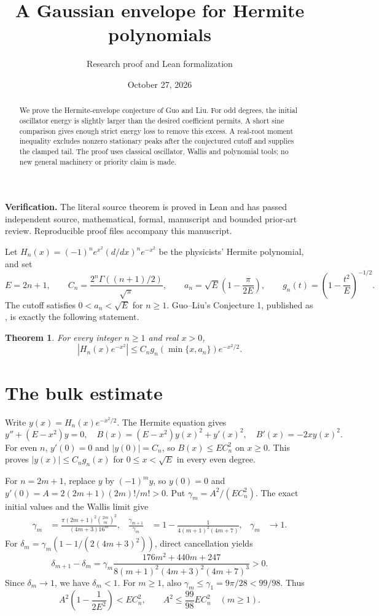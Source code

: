 \documentclass[11pt]{article}
\title{A Gaussian envelope for Hermite polynomials}
\author{Research proof and Lean formalization}
\date{October 27, 2026}
\newtheorem{theorem}{Theorem}
\begin{document}
\maketitle
\begin{abstract}
We prove the Hermite-envelope conjecture of Guo and Liu. For odd degrees, the initial oscillator energy is slightly larger than the desired coefficient permits. A short sine comparison gives enough strict energy loss to remove this excess. A real-root moment inequality excludes nonzero stationary peaks after the conjectured cutoff and supplies the clamped tail. The proof uses classical oscillator, Wallis and polynomial tools; no new general machinery or priority claim is made.
\end{abstract}
\noindent\textbf{Verification.} The literal source theorem is proved in Lean and has passed independent source, mathematical, formal, manuscript and bounded prior-art review. Reproducible proof files accompany this manuscript.

Let $H_n(x)=(-1)^n e^{x^2}(d/dx)^n e^{-x^2}$ be the physicists' Hermite polynomial, and set
\[
 E=2n+1,\qquad C_n=\frac{2^n\Gamma((n+1)/2)}{\sqrt\pi},\qquad
 a_n=\sqrt E\left(1-\frac\pi{2E}\right),\qquad
 g_n(t)=\left(1-\frac{t^2}{E}\right)^{-1/2}.
\]
The cutoff satisfies $0<a_n<\sqrt E$ for $n\geq1$. Guo--Liu's Conjecture 1, published as \cite[eq.~(29), p.~8]{GL}, is exactly the following statement.
\begin{theorem}\label{main}
For every integer $n\geq1$ and real $x>0$,
\[
 |H_n(x)e^{-x^2}|\leq C_n g_n(\min\{x,a_n\})e^{-x^2/2}.
\]
\end{theorem}

\section*{The bulk estimate}
Write $y(x)=H_n(x)e^{-x^2/2}$. The Hermite equation gives
\begin{equation}\label{energy}
 y''+(E-x^2)y=0,\quad B(x)=(E-x^2)y(x)^2+y'(x)^2,\quad B'(x)=-2xy(x)^2.
\end{equation}
For even $n$, $y'(0)=0$ and $|y(0)|=C_n$, so $B(x)\leq EC_n^2$ on $x\geq0$. This proves $|y(x)|\leq C_ng_n(x)$ for $0\leq x<\sqrt E$ in every even degree.

For $n=2m+1$, replace $y$ by $(-1)^m y$, so $y(0)=0$ and
$y'(0)=A=2(2m+1)(2m)!/m!>0$. Put $\gamma_m=A^2/(EC_n^2)$. The exact initial values and the Wallis limit give
\begin{align}
 \gamma_m&=\frac{\pi(2m+1)^2\binom{2m}{m}^2}{(4m+3)16^m},&
 \frac{\gamma_{m+1}}{\gamma_m}&=1-\frac1{4(m+1)^2(4m+7)},&\gamma_m&\longrightarrow1.\label{wallis}
\end{align}
For $\delta_m=\gamma_m(1-1/(2(4m+3)^2))$, direct cancellation yields
\[
 \delta_{m+1}-\delta_m=
 \gamma_m\frac{176m^2+440m+247}{8(m+1)^2(4m+3)^2(4m+7)^3}>0.
\]
Since $\delta_m\to1$, we have $\delta_m<1$. For $m\geq1$, also
$\gamma_m\leq\gamma_1=9\pi/28<99/98$. Thus
\begin{equation}\label{initial}
 A^2\left(1-\frac1{2E^2}\right)<EC_n^2,\qquad A^2\leq\frac{99}{98}EC_n^2\quad(m\geq1).
\end{equation}
\end{document}

